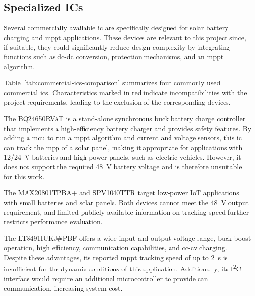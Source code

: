 \subsection{Specialized ICs}
\label{sec:ICs}
    Several commercially available \acf{ic} are specifically designed for solar battery charging and \ac{mppt} applications. These devices are relevant to this project since, if suitable, they could significantly reduce design complexity by integrating functions such as \acs{dc}-\acs{dc} conversion, protection mechanisms, and an \acs{mppt} algorithm.

    Table~\ref{tab:commercial-ics-comparison} summarizes four commonly used commercial \acp{ic}. Characteristics marked in red indicate incompatibilities with the project requirements, leading to the exclusion of the corresponding devices.

    The BQ24650RVAT is a stand-alone synchronous buck battery charge controller that implements a high-efficiency battery charger and provides safety features. By adding a \ac{mcu} to run a \acs{mppt} algorithm and current and voltage sensors, this \acs{ic} can track the \ac{mpp} of a solar panel, making it appropriate for applications with 12/24~V batteries and high-power panels, such as electric vehicles. However, it does not support the required 48~V battery voltage and is therefore unsuitable for this work.

    The MAX20801TPBA+ and SPV1040TTR target low-power IoT applications with small batteries and solar panels. Both devices cannot meet the 48~V output requirement, and limited publicly available information on tracking speed further restricts performance evaluation.

    The LT8491IUKJ\#PBF offers a wide input and output voltage range, buck-boost operation, high efficiency, communication capabilities, and \acs{cc}-\acs{cv} charging. Despite these advantages, its reported \acs{mppt} tracking speed of up to 2~s is insufficient for the dynamic conditions of this application. Additionally, its I\textsuperscript{2}C interface would require an additional microcontroller to provide \acs{can} communication, increasing system cost.

